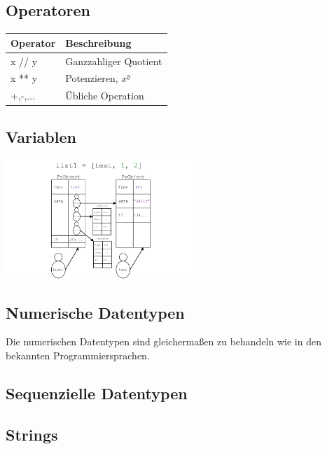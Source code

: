 		\begin{minipage}[t]{3cm}
			\subsection*{Operatoren}
				\begin{tabular}{|l l|}
					\hline \bfseries{Operator} & \bfseries{Beschreibung} \\\hline
					x // y & Ganzzahliger Quotient\\
					x ** y & Potenzieren, $x^y$ \\ 
					+,-,... & Übliche Operation\\\hline
				\end{tabular}
			\subsection*{Variablen}
				\includegraphics[height=4.5cm, align=t]{pics/Variablen.PNG}
		\end{minipage}
	\subsection*{Numerische Datentypen}
	Die numerischen Datentypen sind gleichermaßen zu behandeln wie in den bekannten Programmiersprachen.
	\subsection*{Sequenzielle Datentypen}
	\subsection{Strings}
	